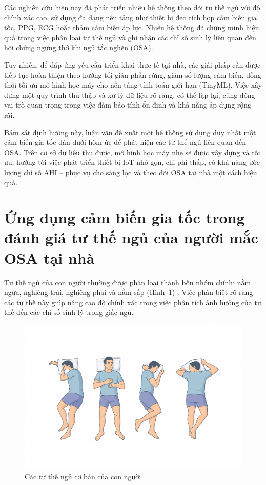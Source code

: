 Các nghiên cứu hiện nay đã phát triển nhiều hệ thống theo dõi tư thế ngủ với độ
chính xác cao, sử dụng đa dạng nền tảng như thiết bị đeo tích hợp cảm biến gia
tốc, PPG, ECG hoặc thảm cảm biến áp lực. Nhiều hệ thống đã chứng minh hiệu quả
trong việc phân loại tư thế ngủ và ghi nhận các chỉ số sinh lý liên quan đến
hội chứng ngưng thở khi ngủ tắc nghẽn (OSA).

Tuy nhiên, để đáp ứng yêu cầu triển khai thực tế tại nhà, các giải pháp cần
được tiếp tục hoàn thiện theo hướng tối giản phần cứng, giảm số lượng cảm biến,
đồng thời tối ưu mô hình học máy cho nền tảng tính toán giới hạn (TinyML). Việc
xây dựng một quy trình thu thập và xử lý dữ liệu rõ ràng, có thể lặp lại, cũng
đóng vai trò quan trọng trong việc đảm bảo tính ổn định và khả năng áp dụng
rộng rãi.

Bám sát định hướng này, luận văn đề xuất một hệ thống sử dụng duy nhất một cảm
biến gia tốc dán dưới hõm ức để phát hiện các tư thế ngủ liên quan đến OSA.
Trên cơ sở dữ liệu thu được, mô hình học máy nhẹ sẽ được xây dựng và tối ưu,
hướng tới việc phát triển thiết bị IoT nhỏ gọn, chi phí thấp, có khả năng ước
lượng chỉ số AHI – phục vụ cho sàng lọc và theo dõi OSA tại nhà một cách hiệu
quả.

\section{Ứng dụng cảm biến gia tốc trong đánh giá tư thế ngủ của người mắc OSA tại nhà}

Tư thế ngủ của con người thường được phân loại thành bốn nhóm chính: nằm ngửa,
nghiêng trái, nghiêng phải và nằm sấp (Hình~\ref{4_tuthe}) \cite{4_ngu}. Việc
phân biệt rõ ràng các tư thế này giúp nâng cao độ chính xác trong việc phân
tích ảnh hưởng của tư thế đến các chỉ số sinh lý trong giấc ngủ.

\begin{figure}
  \centering
  \includegraphics[width=\textwidth]{images/4ngu.png}
  \vspace*{-7mm}
  \caption{Các tư thế ngủ cơ bản của con người}
  \label{4_tuthe}
\end{figure}

